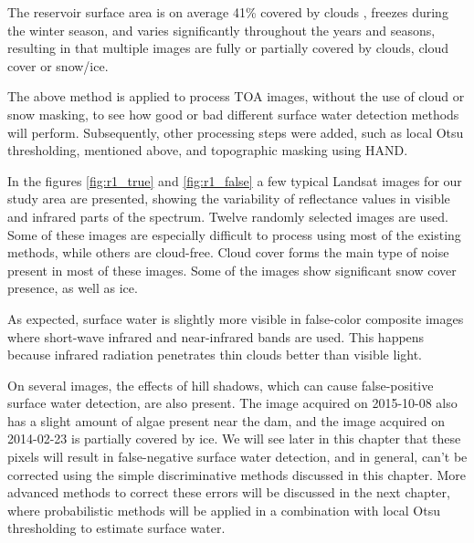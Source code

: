 The reservoir surface area is on average 41\% covered by clouds \cite{wilson2016remotely}, freezes during the winter season, and varies significantly throughout the years and seasons, resulting in that multiple images are fully or partially covered by clouds, cloud cover or snow/ice.

The above method is applied to process TOA images, without the use of cloud or snow masking, to see how good or bad different surface water detection methods will perform. Subsequently, other processing steps were added, such as local Otsu thresholding, mentioned above, and topographic masking using HAND. 


In the figures \ref{fig:r1_true} and \ref{fig:r1_false} a few typical Landsat images for our study area are presented, showing the variability of reflectance values in visible and infrared parts of the spectrum. Twelve randomly selected images are used. Some of these images are especially difficult to process using most of the existing methods, while others are cloud-free. Cloud cover forms the main type of noise present in most of these images. Some of the images show significant snow cover presence, as well as ice. 

As expected, surface water is slightly more visible in false-color composite images where short-wave infrared and near-infrared bands are used. This happens because infrared radiation penetrates thin clouds better than visible light. 

On several images, the effects of hill shadows, which can cause false-positive surface water detection, are also present. The image acquired on 2015-10-08 also has a slight amount of algae present near the dam, and the image acquired on 2014-02-23 is partially covered by ice. We will see later in this chapter that these pixels will result in false-negative surface water detection, and in general, can't be corrected using the simple discriminative methods discussed in this chapter. More advanced methods to correct these errors will be discussed in the next chapter, where probabilistic methods will be applied in a combination with local Otsu thresholding to estimate surface water.


